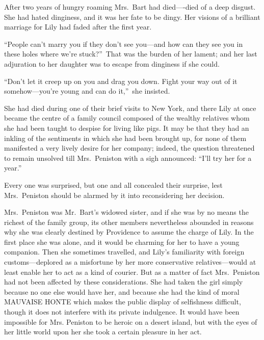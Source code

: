 \documentclass[12pt,a4paper]{book}
\begin{document}
After two years of hungry roaming Mrs.\ Bart had died----died of a
deep disgust. She had hated dinginess, and it was her fate to be
dingy. Her visions of a brilliant marriage for Lily had faded
after the first year.





``People can't marry you if they don't see you---and how can they
see you in these holes where we're stuck?''\ That was the burden of
her lament; and her last adjuration to her daughter was to escape
from dinginess if she could.





``Don't let it creep up on you and drag you down. Fight your way
out of it somehow---you're young and can do it,''\ she insisted.





She had died during one of their brief visits to New York, and
there Lily at once became the centre of a family council composed
of the wealthy relatives whom she had been taught to despise for
living like pigs. It may be that they had an inkling of the
sentiments in which she had been brought up, for none of them
manifested a very lively desire for her company; indeed, the
question threatened to remain unsolved till Mrs.\ Peniston with a
sigh announced: ``I'll try her for a year.''





Every one was surprised, but one and all concealed their
surprise, lest Mrs.\ Peniston should be alarmed by it into
reconsidering her decision.





Mrs.\ Peniston was Mr.\ Bart's widowed sister, and if she was by no
means the richest of the family group, its other members
nevertheless abounded in reasons why she was clearly destined by
Providence to assume the charge of Lily. In the first place she
was alone, and it would be charming for her to have a
young companion. Then she sometimes travelled, and Lily's
familiarity with foreign customs---deplored as a misfortune by her
more conservative relatives---would at least enable her to act as
a kind of courier. But as a matter of fact Mrs.\ Peniston had not
been affected by these considerations. She had taken the girl
simply because no one else would have her, and because she had
the kind of moral MAUVAISE HONTE which makes the public display
of selfishness difficult, though it does not interfere with its
private indulgence. It would have been impossible for Mrs.
Peniston to be heroic on a desert island, but with the eyes of
her little world upon her she took a certain pleasure in her act.
\end{document}
